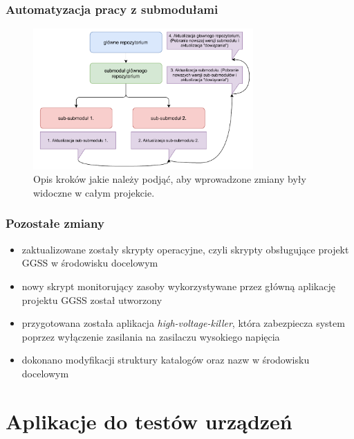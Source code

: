 \documentclass[10pt]{beamer}
\begin{document}
\begin{frame}
\frametitle{Automatyzacja pracy z submodułami}
\begin{figure}
    \includegraphics[width=0.75\textwidth]{static/submodules_update}
    \caption{Opis kroków jakie należy podjąć, aby wprowadzone zmiany były widoczne w całym projekcie.}
\end{figure}
\end{frame}

\begin{frame}
\frametitle{Pozostałe zmiany}
\begin{itemize}
    \item zaktualizowane zostały skrypty operacyjne, czyli skrypty obsługujące projekt GGSS w środowisku docelowym
    \item nowy skrypt monitorujący zasoby wykorzystywane przez główną aplikację projektu GGSS został utworzony
    \item przygotowana została aplikacja \emph{high-voltage-killer}, która zabezpiecza system poprzez wyłączenie zasilania na zasilaczu wysokiego napięcia
    \item dokonano modyfikacji struktury katalogów oraz nazw w środowisku docelowym
\end{itemize}
\end{frame}

\section{Aplikacje do testów urządzeń}
\end{document}
